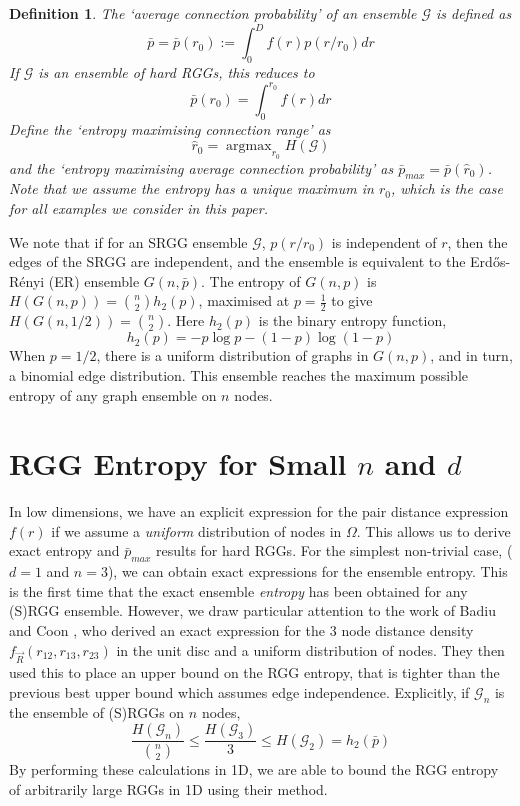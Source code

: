 \documentclass{article}
\DeclareMathOperator*{\argmax}{argmax}
\newtheorem{definition}{Definition}
\newcommand{\graph}{\mathcal{G}}
\begin{document}
\begin{definition}
    The `average connection probability' of an ensemble $\mathcal{G}$ is defined as 
    \begin{equation}
        \bar{p} = \bar{p}(r_0) := \int_0^D f(r)p(r/r_0) dr
    \end{equation}
    If $\graph$ is an ensemble of hard RGGs, this reduces to
    \begin{equation}
        \bar{p}(r_0) = \int_0^{r_0} f(r)dr
    \end{equation}
    Define the `entropy maximising connection range' as 
    \begin{equation}
        \hat{r}_0 = \argmax_{r_0} H(\mathcal{G})
    \end{equation}
    and the `entropy maximising average connection probability' as $\bar{p}_{max} = \bar{p}(\hat{r}_0)$. Note that we assume the entropy has a unique maximum in $r_0$, which is the case for all examples we consider in this paper.
\end{definition}
We note that if for an SRGG ensemble $\graph$, $p(r/r_0)$ is independent of $r$, then the edges of the SRGG are independent, and the ensemble is equivalent to the Erd\H os-R\'enyi (ER) ensemble $G(n, \bar{p})$. The entropy of $G(n,p)$ is $H(G(n,p)) = \binom{n}{2}h_2(p)$, maximised at $p = \frac{1}{2}$ to give $H(G(n,1/2)) = \binom{n}{2}$. Here $h_2(p)$ is the binary entropy function,
\begin{equation}
    h_2(p) = -p\log p - (1-p)\log (1-p)
\end{equation}
When $p=1/2$, there is a uniform distribution of graphs in $G(n,p)$, and in turn, a binomial edge distribution. This ensemble reaches the maximum possible entropy of any graph ensemble on $n$ nodes.
\section{RGG Entropy for Small $n$ and $d$}
\label{low_dim}
In low dimensions, we have an explicit expression for the pair distance expression $f(r)$ if we assume a \textit{uniform} distribution of nodes in $\Omega$. This allows us to derive exact entropy and $\bar{p}_{max}$ results for hard RGGs. For the simplest non-trivial case, ($d=1$ and $n=3$), we can obtain exact expressions for the ensemble entropy. This is the first time that the exact ensemble \textit{entropy} has been obtained for any (S)RGG ensemble. However, we draw particular attention to the work of Badiu and Coon \cite{badiu2018distribution}, who derived an exact expression for the 3 node distance density $f_{\vec{R}}(r_{12}, r_{13}, r_{23})$ in the unit disc and a uniform distribution of nodes.  They then used this to place an upper bound on the RGG entropy, that is tighter than the previous best upper bound which assumes edge independence. Explicitly, if $\graph_n$ is the ensemble of (S)RGGs on $n$ nodes,
\begin{equation}
    \frac{H(\graph_n)}{\binom{n}{2}} \leq \frac{H(\graph_3)}{3} \leq H(\graph_2) = h_2(\bar{p}) 
\end{equation}
By performing these calculations in 1D, we are able to bound the RGG entropy of arbitrarily large RGGs in 1D using their method. 
\end{document}
